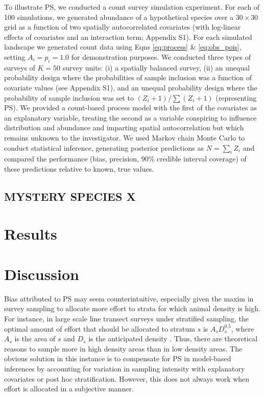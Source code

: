 \documentclass[times,mee,doublespace,]{besauth2}
\begin{document}
To illustrate PS, we conducted a count survey simulation experiment.  For each of 100 simulations, we generated abundance of a hypothetical species over a $30 \times 30$ grid as a function of two spatially autocorrelated covariates (with log-linear effects of covariates and an interaction term; Appendix S1).   For each simulated landscape we generated count data using Eqns \ref{eq:process} \& \ref{eq:obs_pois}, setting $A_i = p_i = 1.0$ for demonstration purposes.  We conducted three types of surveys of $K=50$ survey units: (i) a spatially balanced survey, (ii) an unequal probability design where the probabilities of sample inclusion was a function of covariate values (see Appendix S1), and an unequal probability design where the probability of sample inclusion was set to $(Z_i+1)/\sum(Z_i+1)$ (representing PS).  We provided a count-based process model with the first of the covariates as an explanatory variable, treating the second as a variable conspiring to influence distribution and abundance and imparting spatial autocorrelation but which remains unknown to the investigator. We used Markov chain Monte Carlo to conduct statistical inference, generating posterior predictions as $N = \sum_i Z_i$ and compared the performance (bias, precision, 90\% credible interval coverage) of these predictions relative to known, true values.

\subsection{MYSTERY SPECIES X}


\section{Results}

\section{Discussion}

Bias attributed to PS may seem counterintuitive, especially given the maxim in survey sampling to allocate more effort to strata for which animal density is high. For instance, in large scale line transect surveys under stratified sampling, the optimal amount of effort that should be allocated to stratum $s$ is $A_s D_s^{0.5}$, where $A_s$ is the area of $s$ and $D_s$ is the anticipated density \citep[][eqn 7.7]{BucklandEtAl2001}.  Thus, there are theoretical reasons to sample more in high density areas than in low density areas. The obvious solution in this instance is to compensate for PS in model-based inferences by accounting for variation in sampling intensity with explanatory covariates or post hoc stratification. However, this does not always work when effort is allocated in a subjective manner.
\end{document}
